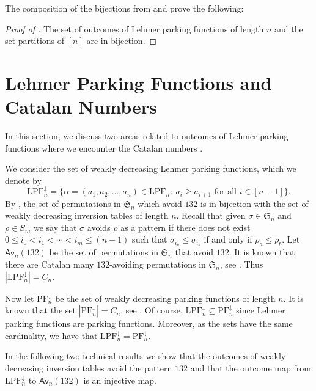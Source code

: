 \documentclass{amsart}
\newcommand{\seqnum}[1]{\href{http://oeis.org/#1}{\underline{#1}}}
\newcommand{\Av}{\mathsf{Av}}
\newcommand{\IT}{\mathrm{LPF}}
\newcommand{\PF}{\mathrm{PF}}
\theoremstyle{definition}
\theoremstyle{definition}
\theoremstyle{remark}
\begin{document}
The composition of the bijections from  and  prove the following:

\begin{proof}[Proof of ]
    The set of outcomes of Lehmer parking functions of length $n$ and the set partitions of $[n]$ are in bijection.
\end{proof}



\section{Lehmer Parking Functions and Catalan Numbers}\label{sec:catalan}

  
In this section, we discuss two areas related to outcomes of Lehmer parking functions where we encounter the Catalan numbers \cite[\seqnum{A000108}]{OEIS}.



We consider the set of weakly decreasing Lehmer parking functions, which we denote by
\[\IT_n^\downarrow=\{\alpha=(a_1,a_2,\ldots,a_n)\in\IT_n:~a_i\geq a_{i+1}\mbox{ for all }i\in[n-1]\}.\] 
By \cite[Lemma 10]{akc}, the set of permutations  in $\mathfrak{S}_n$ which avoid $132$ is in bijection with the set of weakly decreasing inversion tables of length $n$. 
Recall that 
given $\sigma \in \mathfrak{S}_n$ and $\rho \in S_m$ we say that $\sigma$ avoids $\rho$ as a pattern if there does not exist $0 \leq i_0 < i_1 < \cdots <i_m \leq (n-1)$ such that $\sigma_{i_a} \leq \sigma_{i_b}$ if and only if $\rho_a \leq \rho_b$. 
Let $\Av_n(132)$ be the set of permutations in $\mathfrak{S}_n$ that avoid $132$.
It is known that there are Catalan many $132$-avoiding permutations in $\mathfrak{S}_n$, see \cite{stanley_2015}. 
Thus $|\IT_n^\downarrow|=C_n$.

Now let $\PF_n^\downarrow$ be the set of weakly decreasing parking functions of length $n$. 
It is known that the set $|\PF_n^\downarrow|=C_n$, see \cite{stanley_2015}.
Of course, $\IT_n^\downarrow\subseteq \PF_n^\downarrow$ since Lehmer parking functions are parking functions. Moreover, as the sets have the same cardinality, we have that $\IT_n^\downarrow=\PF_n^\downarrow$.

In the following two technical results we show that the outcomes of weakly decreasing inversion tables avoid the pattern $132$ and that the outcome map from $\IT_n^\downarrow$ to $\Av_n(132)$ is an injective map.
\end{document}
